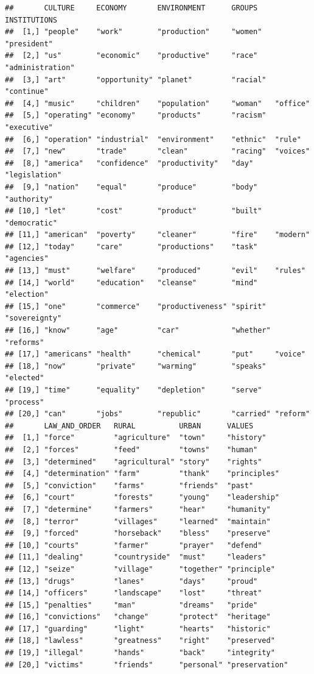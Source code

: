 \documentclass[
]{article}
\begin{document}
\begin{verbatim}
##       CULTURE     ECONOMY       ENVIRONMENT      GROUPS    INSTITUTIONS    
##  [1,] "people"    "work"        "production"     "women"   "president"     
##  [2,] "us"        "economic"    "productive"     "race"    "administration"
##  [3,] "art"       "opportunity" "planet"         "racial"  "continue"      
##  [4,] "music"     "children"    "population"     "woman"   "office"        
##  [5,] "operating" "economy"     "products"       "racism"  "executive"     
##  [6,] "operation" "industrial"  "environment"    "ethnic"  "rule"          
##  [7,] "new"       "trade"       "clean"          "racing"  "voices"        
##  [8,] "america"   "confidence"  "productivity"   "day"     "legislation"   
##  [9,] "nation"    "equal"       "produce"        "body"    "authority"     
## [10,] "let"       "cost"        "product"        "built"   "democratic"    
## [11,] "american"  "poverty"     "cleaner"        "fire"    "modern"        
## [12,] "today"     "care"        "productions"    "task"    "agencies"      
## [13,] "must"      "welfare"     "produced"       "evil"    "rules"         
## [14,] "world"     "education"   "cleanse"        "mind"    "election"      
## [15,] "one"       "commerce"    "productiveness" "spirit"  "sovereignty"   
## [16,] "know"      "age"         "car"            "whether" "reforms"       
## [17,] "americans" "health"      "chemical"       "put"     "voice"         
## [18,] "now"       "private"     "warming"        "speaks"  "elected"       
## [19,] "time"      "equality"    "depletion"      "serve"   "process"       
## [20,] "can"       "jobs"        "republic"       "carried" "reform"        
##       LAW_AND_ORDER   RURAL          URBAN      VALUES        
##  [1,] "force"         "agriculture"  "town"     "history"     
##  [2,] "forces"        "feed"         "towns"    "human"       
##  [3,] "determined"    "agricultural" "story"    "rights"      
##  [4,] "determination" "farm"         "thank"    "principles"  
##  [5,] "conviction"    "farms"        "friends"  "past"        
##  [6,] "court"         "forests"      "young"    "leadership"  
##  [7,] "determine"     "farmers"      "hear"     "humanity"    
##  [8,] "terror"        "villages"     "learned"  "maintain"    
##  [9,] "forced"        "horseback"    "bless"    "preserve"    
## [10,] "courts"        "farmer"       "prayer"   "defend"      
## [11,] "dealing"       "countryside"  "must"     "leaders"     
## [12,] "seize"         "village"      "together" "principle"   
## [13,] "drugs"         "lanes"        "days"     "proud"       
## [14,] "officers"      "landscape"    "lost"     "threat"      
## [15,] "penalties"     "man"          "dreams"   "pride"       
## [16,] "convictions"   "change"       "protect"  "heritage"    
## [17,] "guarding"      "light"        "hearts"   "historic"    
## [18,] "lawless"       "greatness"    "right"    "preserved"   
## [19,] "illegal"       "hands"        "back"     "integrity"   
## [20,] "victims"       "friends"      "personal" "preservation"
\end{verbatim}
\end{document}
